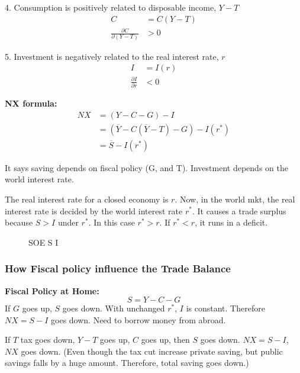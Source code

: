 \documentclass[12pt]{article}
\newcommand{\incfig}[1]{%
\def\svgwidth{\columnwidth}
{#1.pdf_tex}
}
\begin{document}
4. Consumption is positively related to disposable income, $ Y - T $
\begin{align*}
C &= C(Y - T)\\
\frac{\partial C }{\partial (Y - T) } &> 0
\end{align*}

5. Investment is negatively related to the real interest rate, $ r $
\begin{align*}
I &= I(r)\\
\frac{\partial I }{\partial r } &< 0 
\end{align*}


{\textbf {NX formula:}}
\begin{align*}
NX &= (Y - C - G) - I\\
 &= ( \overline{Y} - C( \overline{Y} - T) - G) - I(r^{*})\\
 &=  \overline{S} - I(r^{*})
\end{align*}

It says saving depends on fiscal policy (G, and T). Investment depends on the
world interest rate.


The real interest rate for a closed economy is $ r $. Now, in the world mkt, 
the real interest rate is decided by the world interest rate $ r^{*} $. It
causes a trade surplus because $ S > I $ under $ r^{*} $.
In this case $ r^{*} > r $. If $ r^{*} < r $, it runs in a deficit.\\

\begin{figure}[ht]
    \centering
		\scalebox{0.7}{\incfig{soe-s-i}}
    \caption{SOE S I}
    \label{fig:soe-s-i}
\end{figure}



\subsubsection{How Fiscal policy influence the Trade Balance}
{\textbf {Fiscal Policy at Home:}}\\
\begin{equation*}
S = Y - C - G
\end{equation*}
If $ G $ goes up, $ S $ goes down. With unchanged $ r^{*} $, $ I $ is constant.
Therefore $ NX = S - I $ goes down. Need to borrow money from abroad.

If $ T $ tax goes down, $ Y - T $ goes up, $ C $ goes up, then $ S $ goes down.
$ NX = S - I $, $ NX $ goes down. (Even though the tax cut increase private saving,
but public savings falls by a huge amount. Therefore, total saving goes down.)
\end{document}
